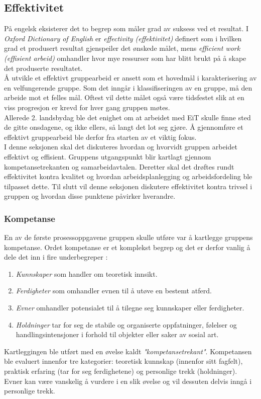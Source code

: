 \subsection{Effektivitet}
På engelsk eksisterer det to begrep som måler grad av suksess ved et resultat. 
I \textit{Oxford Dictionary of English} er \textit{effectivity (effektivitet)} definert som i hvilken grad et produsert resultat gjenspeiler det ønskede målet, mens \textit{efficient work (effisient arbeid)} omhandler hvor mye ressurser som har blitt brukt på å skape det produserte resultatet.\\

Å utvikle et effektivt gruppearbeid er ansett som et hovedmål i karakterisering av en velfungerende gruppe. 
Som det inngår i klassifiseringen av en gruppe, må den arbeide mot et felles mål. 
Oftest vil dette målet også være tidsfestet slik at en viss progresjon er krevd for hver gang gruppen møtes.\\

Allerede 2. landsbydag ble det enighet om at arbeidet med EiT skulle finne sted de gitte onsdagene, og ikke ellers, så langt det lot seg gjøre. 
Å gjennomføre et effektivt gruppearbeid ble derfor fra starten av et viktig fokus.\\

I denne seksjonen skal det diskuteres hvordan og hvorvidt gruppen arbeidet effektivt og effisient.
Gruppens utgangspunkt blir kartlagt gjennom kompetansetrekanten og samarbeidavtalen.
Deretter skal det drøftes rundt effektivitet kontra kvalitet og hvordan arbeidsplanlegging og arbeidsfordeling ble tilpasset dette.
Til slutt vil denne seksjonen diskutere effektivitet kontra trivsel i gruppen og hvordan disse punktene påvirker hverandre.\\

\subsubsection{Kompetanse}
En av de første prosessoppgavene gruppen skulle utføre var å kartlegge gruppens kompetanse.
Ordet kompetanse er et komplekst begrep og det er derfor vanlig å dele det inn i fire underbegreper \cite{orgorg}:
\begin{enumerate}
\item \textit{Kunnskaper} som handler om teoretisk innsikt.
\item \textit{Ferdigheter} som omhandler evnen til å utøve en bestemt atferd.
\item \textit{Evner} omhandler potensialet til å tilegne seg kunnskaper eller ferdigheter.
\item \textit{Holdninger} tar for seg de stabile og organiserte oppfatninger, følelser og handlingsintensjoner i forhold til objekter eller saker av sosial art.
\end{enumerate}
Kartleggingen ble utført med en øvelse kaldt \emph{"kompetansetrekant"}.
Kompetansen ble evaluert innenfor tre kategorier: teoretisk kunnskap (innenfor sitt fagfelt), praktisk erfaring (tar for seg ferdighetene) og personlige trekk (holdninger).
Evner kan være vanskelig å vurdere i en slik øvelse og vil dessuten delvis inngå i personlige trekk.\\

